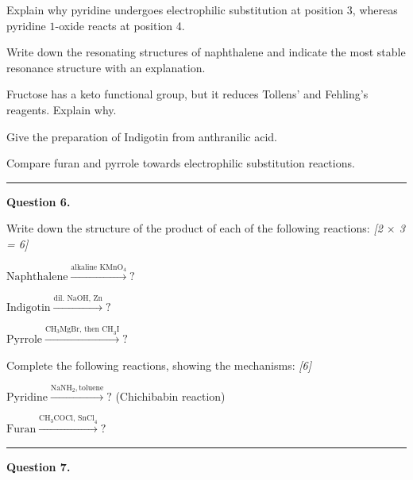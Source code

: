 \documentclass[11pt,a4paper]{article}
\newcommand{\pts}[1]{\hfill   \textit{[#1]}}
\begin{document}
\begin{parts}
  \item Explain why pyridine undergoes electrophilic substitution at position 3, whereas pyridine $1$-oxide reacts at position 4.
  \item Write down the resonating structures of naphthalene and indicate the most stable resonance structure with an explanation.
  \item Fructose has a keto functional group, but it reduces Tollens' and Fehling's reagents. Explain why.
  \item Give the preparation of Indigotin from anthranilic acid.
  \item Compare furan and pyrrole towards electrophilic substitution reactions.
\end{parts}

\medskip\rule{\linewidth}{0.2pt}




\noindent   \textbf{Question 6.}

\begin{parts}
  \item Write down the structure of the product of each of the following reactions: \pts{2 $ \times$ 3 = 6}
  
\begin{parts}
    \item $ \text{Naphthalene} \xrightarrow{ \text{alkaline KMnO}_4} ?$
    \item $ \text{Indigotin} \xrightarrow{ \text{dil. NaOH, Zn}} ?$
    \item $ \text{Pyrrole} \xrightarrow{ \text{CH}_3 \text{MgBr, then CH}_3 \text{I}} ?$
  \end{parts}
  \item Complete the following reactions, showing the mechanisms: \pts{6}
  
\begin{parts}
    \item $ \text{Pyridine} \xrightarrow{ \text{NaNH}_2,  \text{toluene}} ?$ (Chichibabin reaction)
    \item $ \text{Furan} \xrightarrow{ \text{CH}_3 \text{COCl, SnCl}_4} ?$
  \end{parts}
\end{parts}

\medskip\rule{\linewidth}{0.2pt}




\noindent   \textbf{Question 7.}
\end{document}
